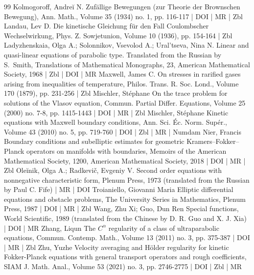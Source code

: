 \begin{thebibliography}{99}
 Kolmogoroff, Andreĭ N. Zufällige Bewegungen (zur Theorie der Brownschen Bewegung), Ann. Math., Volume 35 (1934) no. 1, pp. 116-117 | DOI | MR | Zbl
 Landau, Lev D. Die kinetische Gleichung für den Fall Coulombscher Wechselwirkung, Phys. Z. Sowjetunion, Volume 10 (1936), pp. 154-164 | Zbl
 Ladyzhenskaia, Olga A.; Solonnikov, Vsevolod A.; Ural’tseva, Nina N. Linear and quasi-linear equations of parabolic type. Translated from the Russian by S. Smith, Translations of Mathematical Monographs, 23, American Mathematical Society, 1968 | Zbl | DOI | MR
 Maxwell, James C. On stresses in rarified gases arising from inequalities of temperature, Philos. Trans. R. Soc. Lond., Volume 170 (1879), pp. 231-256 | Zbl
 Mischler, Stéphane On the trace problem for solutions of the Vlasov equation, Commun. Partial Differ. Equations, Volume 25 (2000) no. 7-8, pp. 1415-1443 | DOI | MR | Zbl
 Mischler, Stéphane Kinetic equations with Maxwell boundary conditions, Ann. Sci. Éc. Norm. Supér., Volume 43 (2010) no. 5, pp. 719-760 | DOI | Zbl | MR | Numdam
 Nier, Francis Boundary conditions and subelliptic estimates for geometric Kramers–Fokker–Planck operators on manifolds with boundaries, Memoirs of the American Mathematical Society, 1200, American Mathematical Society, 2018 | DOI | MR | Zbl
 Oleĭnik, Olga A.; Radkevič, Evgeniy V. Second order equations with nonnegative characteristic form, Plenum Press, 1973 (translated from the Russian by Paul C. Fife) | MR | DOI
 Troianiello, Giovanni Maria Elliptic differential equations and obstacle problems, The University Series in Mathematics, Plenum Press, 1987 | DOI | MR | Zbl
 Wang, Zhu Xi; Guo, Dun Ren Special functions, World Scientific, 1989 (translated from the Chinese by D. R. Guo and X. J. Xia) | DOI | MR
 Zhang, Liqun The ${C}^\alpha $ regularity of a class of ultraparabolic equations, Commun. Contemp. Math., Volume 13 (2011) no. 3, pp. 375-387 | DOI | MR | Zbl
 Zhu, Yuzhe Velocity averaging and Hölder regularity for kinetic Fokker-Planck equations with general transport operators and rough coefficients, SIAM J. Math. Anal., Volume 53 (2021) no. 3, pp. 2746-2775 | DOI | Zbl | MR
\end{thebibliography}
